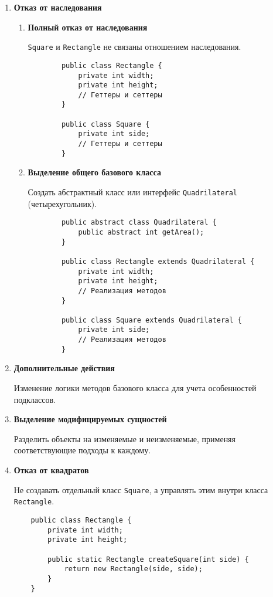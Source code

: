 \begin{enumerate}
\begin{enumerate}
    \end{enumerate}
    
    \item \textbf{Отказ от наследования}
    \begin{enumerate}
        \item \textbf{Полный отказ от наследования}
        
        \texttt{Square} и \texttt{Rectangle} не связаны отношением наследования.
        \begin{verbatim}
        public class Rectangle {
            private int width;
            private int height;
            // Геттеры и сеттеры
        }

        public class Square {
            private int side;
            // Геттеры и сеттеры
        }
        \end{verbatim}
        
        \item \textbf{Выделение общего базового класса}
        
        Создать абстрактный класс или интерфейс \texttt{Quadrilateral} (четырехугольник).
        \begin{verbatim}
        public abstract class Quadrilateral {
            public abstract int getArea();
        }

        public class Rectangle extends Quadrilateral {
            private int width;
            private int height;
            // Реализация методов
        }

        public class Square extends Quadrilateral {
            private int side;
            // Реализация методов
        }
        \end{verbatim}
        
    \end{enumerate}
    
    \item \textbf{Дополнительные действия}
    
    Изменение логики методов базового класса для учета особенностей подклассов.
    
    \item \textbf{Выделение модифицируемых сущностей}
    
    Разделить объекты на изменяемые и неизменяемые, применяя соответствующие подходы к каждому.
    
    \item \textbf{Отказ от квадратов}
    
    Не создавать отдельный класс \texttt{Square}, а управлять этим внутри класса \texttt{Rectangle}.
    \begin{verbatim}
    public class Rectangle {
        private int width;
        private int height;

        public static Rectangle createSquare(int side) {
            return new Rectangle(side, side);
        }
    }
    \end{verbatim}
    
\end{enumerate}


